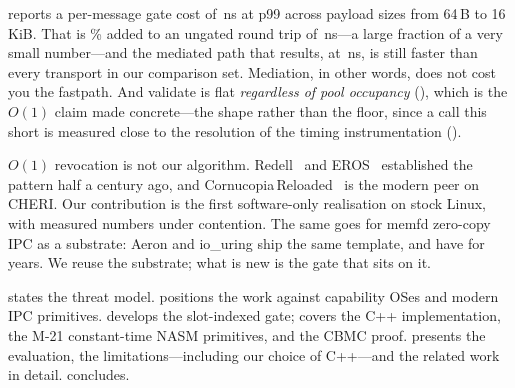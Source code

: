 reports a per-message gate cost of
\gateOverheadTail\,ns at p99 across payload sizes from 64\,B to
16\,KiB. That is \gateOverheadPercent\% added to an ungated round
trip of \rawAstraRTT\,ns---a large fraction of a very small
number---and the mediated path that results, at
\gatedAstraRTT\,ns, is still faster than every transport in our
comparison set. Mediation, in other words, does not cost you the
fastpath. And validate is flat \textit{regardless of pool occupancy}
(), which is the $O(1)$ claim made concrete---the
shape rather than the floor, since a call this short is measured close
to the resolution of the timing instrumentation
().

$O(1)$ revocation is not our algorithm. Redell~\cite{redell74} and
EROS~\cite{shapiro1999eros} established the pattern half a century
ago, and Cornucopia\,Reloaded~\cite{cornucopia-reloaded} is the
modern peer on CHERI. Our contribution is the first software-only
realisation on stock Linux, with measured numbers under contention.
The same goes for memfd zero-copy IPC as a substrate: Aeron and
io\_uring ship the same template, and have for years. We reuse the
substrate; what is new is the gate that sits on it.

 states the threat model.  positions
the work against capability OSes and modern IPC primitives.
 develops the slot-indexed gate; 
covers the C++ implementation, the M-21 constant-time NASM
primitives, and the CBMC proof.  presents the
evaluation,  the limitations---including our choice of
C++---and  the related work in detail.
 concludes.
